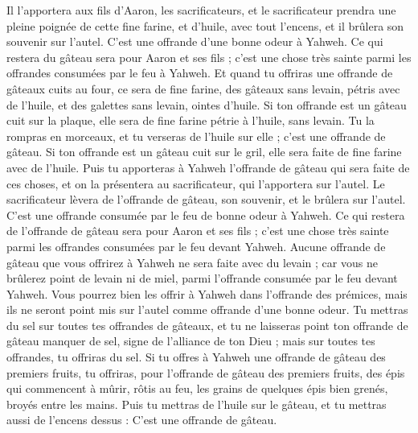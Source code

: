 \begin{multicols}{2}
Il l'apportera aux fils d'Aaron, les sacrificateurs, et le sacrificateur prendra une pleine poignée de cette fine farine, et d'huile, avec tout l'encens, et il brûlera son souvenir sur l'autel. C'est une offrande d'une bonne odeur à Yahweh.
Ce qui restera du gâteau sera pour Aaron et ses fils ; c'est une chose très sainte parmi les offrandes consumées par le feu à Yahweh.
Et quand tu offriras une offrande de gâteaux cuits au four, ce sera de fine farine, des gâteaux sans levain, pétris avec de l'huile, et des galettes sans levain, ointes d'huile.
Si ton offrande est un gâteau cuit sur la plaque, elle sera de fine farine pétrie à l'huile, sans levain.
Tu la rompras en morceaux, et tu verseras de l'huile sur elle ; c'est une offrande de gâteau.
Si ton offrande est un gâteau cuit sur le gril, elle sera faite de fine farine avec de l'huile.
Puis tu apporteras à Yahweh l'offrande de gâteau qui sera faite de ces choses, et on la présentera au sacrificateur, qui l'apportera sur l'autel.
Le sacrificateur lèvera de l'offrande de gâteau, son souvenir, et le brûlera sur l'autel. C'est une offrande consumée par le feu de bonne odeur à Yahweh.
Ce qui restera de l'offrande de gâteau sera pour Aaron et ses fils ; c'est une chose très sainte parmi les offrandes consumées par le feu devant Yahweh.
Aucune offrande de gâteau que vous offrirez à Yahweh ne sera faite avec du levain ; car vous ne brûlerez point de levain ni de miel, parmi l'offrande consumée par le feu devant Yahweh.
Vous pourrez bien les offrir à Yahweh dans l'offrande des prémices, mais ils ne seront point mis sur l'autel comme offrande d'une bonne odeur.
Tu mettras du sel sur toutes tes offrandes de gâteaux, et tu ne laisseras point ton offrande de gâteau manquer de sel, signe de l'alliance de ton Dieu ; mais sur toutes tes offrandes, tu offriras du sel.
Si tu offres à Yahweh une offrande de gâteau des premiers fruits, tu offriras, pour l'offrande de gâteau des premiers fruits, des épis qui commencent à mûrir, rôtis au feu, les grains de quelques épis bien grenés, broyés entre les mains.
Puis tu mettras de l'huile sur le gâteau, et tu mettras aussi de l'encens dessus : C'est une offrande de gâteau.

\end{multicols}
